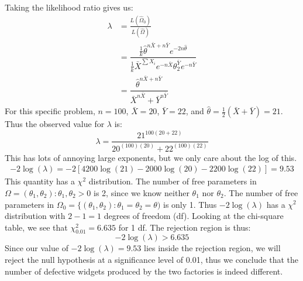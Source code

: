 \documentclass[12pt]{article}
\theoremstyle{definition}
\theoremstyle{remark}
\begin{document}
Taking the likelihood ratio gives us:
\begin{align*}
\lambda &= \frac{ L(\hat{\Omega}_0) }{ L(\hat{\Omega}) } \\
&= \dfrac{ \frac{1}{k} \hat{\theta}^{n\bar{X} + n\bar{Y}} e^{-2 n \hat{\theta}} }{ \frac{1}{k} \bar{X}^{\sum X_i} e^{-n \bar{X}} \theta_2^{\bar{Y}} e^{-n \bar{Y}} } \\
&= \dfrac{ \hat{\theta}^{n\bar{X} + n\bar{Y}} }{ \bar{X}^{n \bar{X}} + \bar{Y}^{n \bar{Y}}}
\end{align*}
For this specific problem, $n = 100$, $\bar{X} = 20$, $\bar{Y} = 22$, and $\hat{\theta} = \frac{1}{2}(\bar{X} + \bar{Y}) =21$. Thus the observed value for $\lambda$ is:
\[
\lambda = \dfrac{ 21^{100(20 + 22)} }{ 20^{(100)(20)} + 22^{(100)(22)} }
\]
This has lots of annoying large exponents, but we only care about the log of this.
\begin{align*}
-2 \log(\lambda) = -2[4200 \log(21) - 2000 \log(20) - 2200 \log(22) ] = 9.53
\end{align*}
This quantity has a $\chi^2$ distribution. The number of free parameters in $\Omega = (\theta_1, \theta_2) : \theta_1, \theta_2 > 0$ is 2, since we know neither $\theta_1$ nor $\theta_2$. The number of free parameters in $\Omega_0 = \{(\theta_1, \theta_2) : \theta_1 = \theta_2 = \theta)$ is only 1. Thus $-2 \log(\lambda)$ has a $\chi^2$ distribution with $2 - 1 = 1$ degrees of freedom (df). Looking at the chi-square table, we see that $\chi^2_{0.01} = 6.635$ for 1 df. The rejection region is thus:
\[
-2 \log(\lambda) > 6.635
\]
Since our value of $-2 \log(\lambda) = 9.53$ lies inside the rejection region, we will reject the null hypothesis at a significance level of 0.01, thus we conclude that the number of defective widgets produced by the two factories is indeed different.
\end{document}
